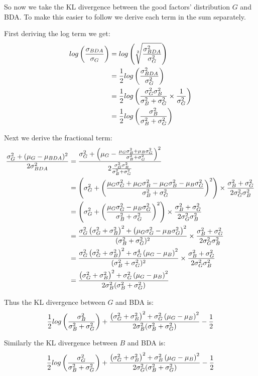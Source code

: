 So now we take the KL divergence between the good factors' distribution $G$ and BDA. To make this easier to follow we derive each term in the sum separately.

First deriving the log term we get:
\begin{align}
	log\left(\frac{\sigma_{BDA}}{\sigma_{G}}\right)
	&= log\left(\sqrt[2]{\frac{\sigma_{BDA}^2}{\sigma_{G}^2}}\right)\\
	&= \frac{1}{2} log\left(\frac{\sigma_{BDA}^2}{\sigma_{G}^2}\right)\\
	&= \frac{1}{2} log\left(\frac{\sigma_G^2 \sigma_B^2}{\sigma_B^2 + \sigma_G^2} \times \frac{1}{\sigma_G^2}\right)\\
	&= \frac{1}{2} log\left(\frac{\sigma_B^2}{\sigma_B^2 + \sigma_G^2}\right)
\end{align}

Next we derive the fractional term:
\begin{align}
	\frac{\sigma_{G}^2 + (\mu_{G} - \mu_{BDA})^2}{2\sigma_{BDA}^2}
	&= \frac{
			\sigma_G^2 + \left(\mu_G - \frac{\mu_G\sigma_B^2 + \mu_B\sigma_G^2}{\sigma_B^2 + \sigma_G^2}\right)^2
		}{
			2 \frac{\sigma_G^2 \sigma_B^2}{\sigma_B^2 + \sigma_G^2}
		}\\
	&= \left(\sigma_G^2 + \left(\frac{\mu_G\sigma_G^2 + \mu_G\sigma_B^2 - \mu_G\sigma_B^2 - \mu_B\sigma_G^2}{\sigma_B^2 + \sigma_G^2}\right)^2\right) \times \frac{\sigma_B^2 + \sigma_G^2}{2\sigma_G^2\sigma_B^2}\\
	&= \left(\sigma_G^2 + \left(\frac{\mu_G\sigma_G^2 - \mu_B\sigma_G^2}{\sigma_B^2 + \sigma_G^2}\right)^2\right) \times \frac{\sigma_B^2 + \sigma_G^2}{2\sigma_G^2\sigma_B^2}\\
	&= \frac{\sigma_G^2\left(\sigma_G^2 + \sigma_B^2\right)^2 + \left(\mu_G\sigma_G^2 - \mu_B\sigma_G^2\right)^2}{(\sigma_B^2 + \sigma_G^2)^2} \times \frac{\sigma_B^2 + \sigma_G^2}{2\sigma_G^2\sigma_B^2}\\
	&= \frac{\sigma_G^2\left(\sigma_G^2 + \sigma_B^2\right)^2 + \sigma_G^4\left(\mu_G - \mu_B\right)^2}{(\sigma_B^2 + \sigma_G^2)^2} \times \frac{\sigma_B^2 + \sigma_G^2}{2\sigma_G^2\sigma_B^2}\\
	&= \frac{\left(\sigma_G^2 + \sigma_B^2\right)^2 + \sigma_G^2\left(\mu_G - \mu_B\right)^2}{2\sigma_B^2(\sigma_B^2 + \sigma_G^2)}
\end{align}

Thus the KL divergence between $G$ and BDA is:
\begin{equation}
	\frac{1}{2} log\left(\frac{\sigma_B^2}{\sigma_B^2 + \sigma_G^2}\right) + \frac{\left(\sigma_G^2 + \sigma_B^2\right)^2 + \sigma_G^2\left(\mu_G - \mu_B\right)^2}{2\sigma_B^2(\sigma_B^2 + \sigma_G^2)} - \frac{1}{2}
\end{equation}

Similarly the KL divergence between $B$ and BDA is:
\begin{equation}
	\frac{1}{2} log\left(\frac{\sigma_G^2}{\sigma_B^2 + \sigma_G^2}\right) + \frac{\left(\sigma_G^2 + \sigma_B^2\right)^2 + \sigma_B^2\left(\mu_G - \mu_B\right)^2}{2\sigma_G^2(\sigma_B^2 + \sigma_G^2)} - \frac{1}{2}
\end{equation}

